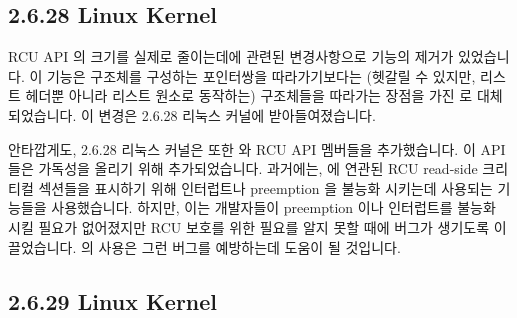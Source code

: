 \subsection{2.6.28 Linux Kernel}

RCU API 의 크기를 실제로 줄이는데에 관련된 변경사항으로
 기능의 제거가 있었습니다.
이 기능은  구조체를 구성하는 포인터쌍을 따라가기보다는 (헷갈릴 수
있지만, 리스트 헤더뿐 아니라 리스트 원소로 동작하는) 구조체들을 따라가는 장점을
가진  로 대체되었습니다.
이 변경은 2.6.28 리눅스 커널에 받아들여졌습니다.

안타깝게도, 2.6.28 리눅스 커널은 또한  와
 RCU API 멤버들을 추가했습니다.
이 API 들은 가독성을 올리기 위해 추가되었습니다.
과거에는,  에 연관된 RCU read-side 크리티컬 섹션들을
표시하기 위해 인터럽트나 preemption 을 불능화 시키는데 사용되는 기능들을
사용했습니다.
하지만, 이는 개발자들이 preemption 이나 인터럽트를 불능화 시킬 필요가
없어졌지만 RCU 보호를 위한 필요를 알지 못할 때에 버그가 생기도록 이끌었습니다.
 의 사용은 그런 버그를 예방하는데 도움이 될 것입니다.

\subsection{2.6.29 Linux Kernel}

